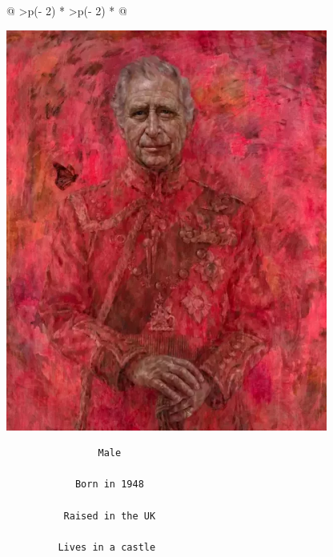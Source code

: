 \documentclass[
  letterpaper,
  DIV=11,
  numbers=noendperiod]{scrreprt}
\begin{document}
\begin{longtable}[]{@{}
  >{\centering\arraybackslash}p{(\columnwidth - 2\tabcolsep) * }
  >{\centering\arraybackslash}p{(\columnwidth - 2\tabcolsep) * }@{}}
\begin{minipage}[t]{\linewidth}
\includegraphics[width=\textwidth,height=5.20833in]{img/charles.webp}

\begin{verbatim}
                Male

            Born in 1948

          Raised in the UK

         Lives in a castle


\end{verbatim}
\end{minipage}
\end{longtable}
\end{document}
